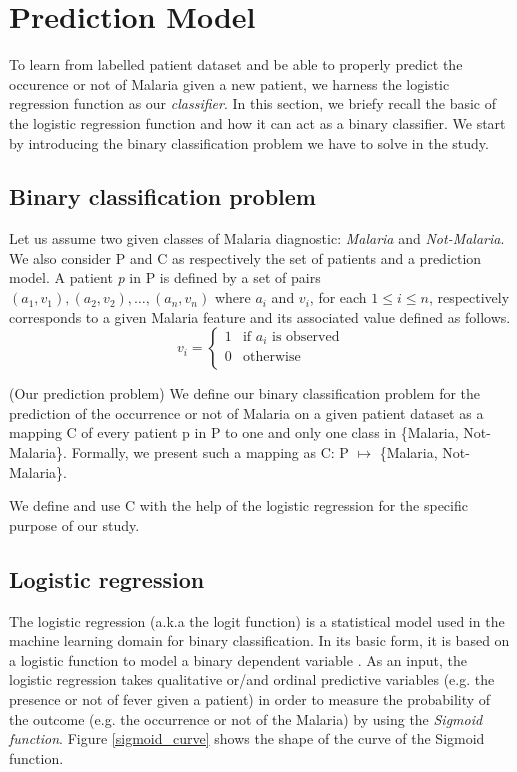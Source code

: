 \section{Prediction Model}\label{prediction_model}
To learn from labelled patient dataset and be able to properly predict 
the occurence or not of Malaria given a new patient, we harness the logistic 
regression function as our \emph{classifier}. 
In this section, we briefy recall the basic of the logistic regression function
and how it can act as a binary classifier. We start by introducing the binary 
classification problem we have to solve in the study.

\subsection{Binary classification problem}
Let us assume two given classes of Malaria diagnostic: \emph{Malaria} and \emph{Not-Malaria}.
We also consider \textsc{P} and \textsc{C} as respectively the set of patients and a prediction model.
A patient \emph{p} in \textsc{P} is defined by a set of pairs $(a_1, v_1), (a_2, v_2), \ldots, (a_n, v_n)$
where $a_i$ and $v_i$, for each $1\leq i\leq n$, respectively corresponds to a given Malaria feature and its associated value defined
as follows.
\begin{equation}
v_i = \left\{
\begin{array}{rl}
1 &\text{if $a_i$ is observed} \\
0 &\text{otherwise} \\
\end{array}
\right.
\end{equation}

\begin{definition}{(Our prediction problem)}
We define our binary classification problem for the prediction of the occurrence
or not of Malaria on a given patient dataset as a mapping \textsc{C} of every patient p in \textsc{P} 
to one and only one class in \{Malaria, Not-Malaria\}. Formally, we present such a mapping as \textsc{C}: \textsc{P} $\mapsto$ \{Malaria, Not-Malaria\}.
\end{definition}


We define and use  \textsc{C} with the help of the logistic regression for the specific purpose of our study. 
\subsection{Logistic regression}
The logistic regression (a.k.a the logit function) is a statistical model used in the machine learning domain for binary classification.
In its basic form, it is based on a logistic function to model a binary dependent variable \cite{Sa14}.
As an input, the logistic regression  takes qualitative or/and ordinal predictive variables (e.g. the presence
or not of fever given a patient) in order to measure the probability of the outcome (e.g. the occurrence or not of the Malaria) 
by using the \emph{Sigmoid function}. Figure \ref{sigmoid_curve} shows the shape of the curve of the Sigmoid function. 


